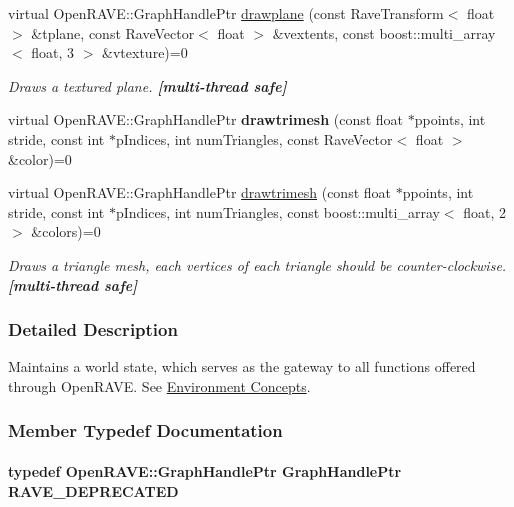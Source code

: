 \begin{DoxyCompactItemize}
virtual OpenRAVE::GraphHandlePtr \hyperlink{classOpenRAVE_1_1EnvironmentBase_a11affcfff03b7440e0fbff2b1199a3e3}{drawplane} (const RaveTransform$<$ float $>$ \&tplane, const RaveVector$<$ float $>$ \&vextents, const boost::multi\_\-array$<$ float, 3 $>$ \&vtexture)=0
\begin{DoxyCompactList}\small\item\em Draws a textured plane. {\bfseries \mbox{[}multi-\/thread safe\mbox{]}} \item\end{DoxyCompactList}\item 
\hypertarget{classOpenRAVE_1_1EnvironmentBase_a427595245f33d750257f4410f8dcea5e}{
virtual OpenRAVE::GraphHandlePtr {\bfseries drawtrimesh} (const float $\ast$ppoints, int stride, const int $\ast$pIndices, int numTriangles, const RaveVector$<$ float $>$ \&color)=0}
\label{classOpenRAVE_1_1EnvironmentBase_a427595245f33d750257f4410f8dcea5e}

\item 
virtual OpenRAVE::GraphHandlePtr \hyperlink{classOpenRAVE_1_1EnvironmentBase_ac94bdee4f1ea190eb88bdbff026a35d3}{drawtrimesh} (const float $\ast$ppoints, int stride, const int $\ast$pIndices, int numTriangles, const boost::multi\_\-array$<$ float, 2 $>$ \&colors)=0
\begin{DoxyCompactList}\small\item\em Draws a triangle mesh, each vertices of each triangle should be counter-\/clockwise. {\bfseries \mbox{[}multi-\/thread safe\mbox{]}} \item\end{DoxyCompactList}\end{DoxyCompactItemize}


\subsubsection{Detailed Description}
Maintains a world state, which serves as the gateway to all functions offered through OpenRAVE. See \hyperlink{architecture__concepts_arch_environment}{Environment Concepts}. 

\subsubsection{Member Typedef Documentation}
\hypertarget{classOpenRAVE_1_1EnvironmentBase_acb298cf75a95a9dcfdc2bfccd7321413}{
\paragraph[{RAVE\_\-DEPRECATED}]{\setlength{\rightskip}{0pt plus 5cm}typedef OpenRAVE::GraphHandlePtr GraphHandlePtr {\bf RAVE\_\-DEPRECATED}}\hfill}
\label{classOpenRAVE_1_1EnvironmentBase_acb298cf75a95a9dcfdc2bfccd7321413}


